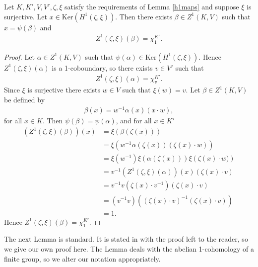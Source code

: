 \begin{lemma}\label{kerh1} Let $K, K', V, V', \zeta, \xi$ satisfy the requirements of Lemma \ref{h1maps} and suppose $\xi$ is surjective. 
Let $x\in \mathrm{Ker}\left(H^1(\zeta, \xi)\right)$. Then there exists $\beta \in Z^1(K, V)$ such that $x = \psi(\beta)$ and
\begin{align*}
	Z^1(\zeta, \xi)(\beta) = \chi^{K'}_1.
\end{align*}
\end{lemma}
\begin{proof}
	Let $\alpha \in Z^1(K, V)$ such that $\psi(\alpha) \in \mathrm{Ker}\left(H^1(\zeta, \xi)\right)$. Hence $Z^1(\zeta, \xi)(\alpha)$ is a 1-coboundary, so there exists $v \in V'$ such that
\begin{align*}
	Z^1(\zeta, \xi)(\alpha) = \chi^{K'}_v.
\end{align*}
Since $\xi$ is surjective there exists $w \in V$ such that $\xi(w) = v$.
Let $\beta \in Z^1(K, V)$ be defined by
\begin{align*}
	\beta(x) = w^{-1}\alpha(x)(x \cdot w),
\end{align*}
for all $x \in K$. Then $\psi(\beta) = \psi(\alpha)$, and for all $x \in K'$
\begin{align*}
	\left(Z^1(\zeta, \xi)(\beta)\right)(x) &= \xi\left(\beta(\zeta(x))\right) \\
		&= \xi\left(w^{-1}\alpha(\zeta(x))(\zeta(x)\cdot w )\right) \\
		&= \xi\left(w^{-1}\right)\xi\left(\alpha(\zeta(x))\right)\xi\left(\zeta(x)\cdot w )\right) \\
		&= v^{-1} \left(Z^1(\zeta, \xi)(\alpha)\right)(x) (\zeta(x) \cdot v ) \\
		&= v^{-1} v(\zeta(x) \cdot v^{-1}) (\zeta(x) \cdot v ) \\
		&= (v^{-1} v) \left((\zeta(x) \cdot v)^{-1} (\zeta(x) \cdot v )\right) \\
		&= 1.
\end{align*}
	Hence $Z^1(\zeta, \xi)(\beta) = \chi^{K'}_1$.
\end{proof}

The next Lemma is standard. It is stated in \cite[TODO]{brown1976cohomology} with the proof left to the reader, so we give our own proof here. The Lemma deals with the abelian 1-cohomology of a finite group, so we alter our notation appropriately.

